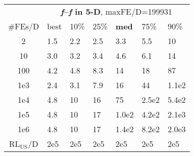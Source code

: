 \begin{tabular}{c|llllll}
 & \multicolumn{6}{|c}{\textbf{\textit{f}\raisebox{-0.35ex}{1}--\textit{f}\raisebox{-0.35ex}{24} in 5-D}, maxFE/D=199931}\\
\#FEs/D & best & 10\% & 25\% & \textbf{med} & 75\% & 90\%\\
2 & \hspace*{1ex}1.5 & \hspace*{1ex}2.2 & \hspace*{1ex}2.5 & \hspace*{1ex}3.3 & \hspace*{1ex}5.5 & 10\\
10 & \hspace*{1ex}3.0 & \hspace*{1ex}3.2 & \hspace*{1ex}3.4 & \hspace*{1ex}4.6 & \hspace*{1ex}6.1 & 14\\
100 & \hspace*{1ex}4.2 & \hspace*{1ex}4.8 & \hspace*{1ex}8.3 & 14 & 18 & 87\\
1e3 & \hspace*{1ex}2.4 & \hspace*{1ex}3.1 & \hspace*{1ex}7.9 & 16 & 44 & 1.1e2\\
1e4 & \hspace*{1ex}4.8 & 10 & 16 & 75 & 2.5e2 & 5.4e2\\
1e5 & \hspace*{1ex}4.8 & 10 & 17 & 1.0e2 & 4.2e2 & 2.1e3\\
1e6 & \hspace*{1ex}4.8 & 10 & 17 & 1.4e2 & 8.2e2 & 2.0e3\\
$\text{RL}_{\text{US}}$/D & 2e5 & 2e5 & 2e5 & 2e5 & 2e5 & 2e5
\end{tabular}
